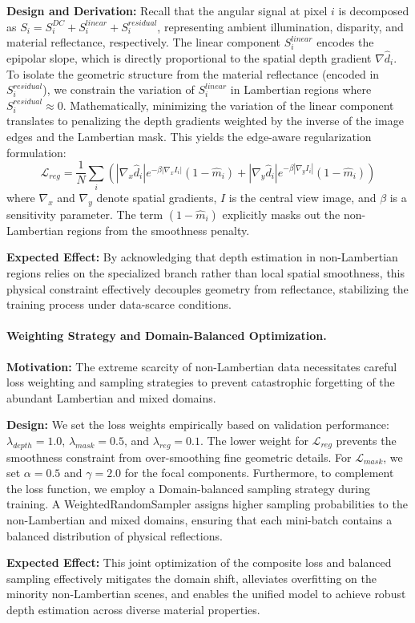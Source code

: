 \textbf{Design and Derivation:} Recall that the angular signal at pixel $i$ is decomposed as $S_i = S_i^{DC} + S_i^{linear} + S_i^{residual}$, representing ambient illumination, disparity, and material reflectance, respectively. The linear component $S_i^{linear}$ encodes the epipolar slope, which is directly proportional to the spatial depth gradient $\nabla \hat{d}_i$. To isolate the geometric structure from the material reflectance (encoded in $S_i^{residual}$), we constrain the variation of $S_i^{linear}$ in Lambertian regions where $S_i^{residual} \approx 0$. Mathematically, minimizing the variation of the linear component translates to penalizing the depth gradients weighted by the inverse of the image edges and the Lambertian mask. This yields the edge-aware regularization formulation:
\begin{equation}
\label{eq:eq20}
\mathcal{L}_{reg} = \frac{1}{N} \sum_{i} \left( |\nabla_x \hat{d}_i| e^{-\beta |\nabla_x I_i|} (1 - \hat{m}_i) + |\nabla_y \hat{d}_i| e^{-\beta |\nabla_y I_i|} (1 - \hat{m}_i) \right)
\end{equation}
where $\nabla_x$ and $\nabla_y$ denote spatial gradients, $I$ is the central view image, and $\beta$ is a sensitivity parameter. The term $(1 - \hat{m}_i)$ explicitly masks out the non-Lambertian regions from the smoothness penalty.

\textbf{Expected Effect:} By acknowledging that depth estimation in non-Lambertian regions relies on the specialized branch rather than local spatial smoothness, this physical constraint effectively decouples geometry from reflectance, stabilizing the training process under data-scarce conditions.

\paragraph{Weighting Strategy and Domain-Balanced Optimization.}
\textbf{Motivation:} The extreme scarcity of non-Lambertian data necessitates careful loss weighting and sampling strategies to prevent catastrophic forgetting of the abundant Lambertian and mixed domains.

\textbf{Design:} We set the loss weights empirically based on validation performance: $\lambda_{depth} = 1.0$, $\lambda_{mask} = 0.5$, and $\lambda_{reg} = 0.1$. The lower weight for $\mathcal{L}_{reg}$ prevents the smoothness constraint from over-smoothing fine geometric details. For $\mathcal{L}_{mask}$, we set $\alpha = 0.5$ and $\gamma = 2.0$ for the focal components. Furthermore, to complement the loss function, we employ a Domain-balanced sampling strategy during training. A WeightedRandomSampler assigns higher sampling probabilities to the non-Lambertian and mixed domains, ensuring that each mini-batch contains a balanced distribution of physical reflections. 

\textbf{Expected Effect:} This joint optimization of the composite loss and balanced sampling effectively mitigates the domain shift, alleviates overfitting on the minority non-Lambertian scenes, and enables the unified model to achieve robust depth estimation across diverse material properties.